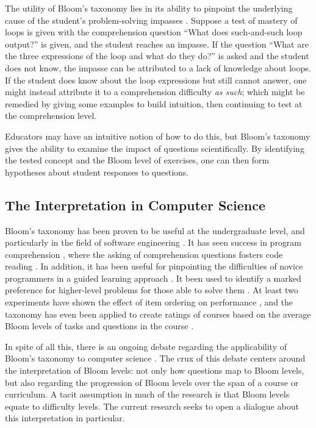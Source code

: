 The utility of Bloom's taxonomy lies in its ability to pinpoint the underlying
cause of the student's problem-solving impasses \cite{shuhidan2011}.  Suppose a
test of mastery of loops is given with the comprehension question ``What does
such-and-such loop output?'' is given, and the student reaches an impasse.  If
the question ``What are the three expressions of the loop and what do they
do?'' is asked and the student does not know, the impasse can be attributed to
a lack of knowledge about loops.  If the student does know about the loop
expressions but still cannot answer, one might instead attribute it to a
comprehension difficulty \emph{as such}; which might be remedied by giving some
examples to build intuition, then continuing to test at the comprehension
level.

Educators may have an intuitive notion of how to do this, but Bloom's taxonomy
gives the ability to examine the impact of questions scientifically.  By
identifying the tested concept and the Bloom level of exercises, one can then
form hypotheses about student responses to questions.  


\subsection{The Interpretation in Computer Science}

Bloom's taxonomy has been proven to be useful at the undergraduate level, and
particularly in the field of software engineering \cite{britto2015,
mahmood2014}.  It has seen success in program comprehension
\cite{buckley2003}, where the asking of comprehension questions fosters code
reading \cite{losada2008}. In addition, it has been useful for pinpointing the
difficulties of novice programmers in a guided learning approach
\cite{shuhidan2011}.  It been used to identify a marked preference for
higher-level problems for those able to solve them \cite{bruyn2011}
\cite{goel2004}.  At least two experiments have shown the effect of item
ordering on performance \cite{newman1988effect,castleberry2016effect}, and the
taxonomy has even been applied to create ratings of courses based on the
average Bloom levels of tasks and questions in the course
\cite{oliver2004course}.

In spite of all this, there is an ongoing debate regarding the applicability of
Bloom's taxonomy to computer science \cite{johnson2006bloom,
fuller2007developing, thompson2008bloom}.  The crux of this debate centers
around the interpretation of Bloom levels: not only how questions map to Bloom
levels, but also regarding the progression of Bloom levels over the span of a
course or curriculum.  A tacit assumption in much of the research is that Bloom
levels equate to difficulty levels.  The current research seeks to open a
dialogue about this interpretation in particular.


